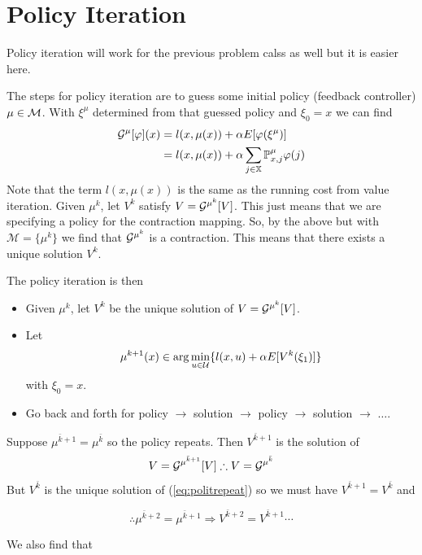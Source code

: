 \section{Policy Iteration}
Policy iteration will work for the previous problem calss as well but it is easier here.

The steps for policy iteration are to guess some initial policy (feedback controller) $\mu\in\mathcal{M}$.
With $\xi^\mu$ determined from that guessed policy and $\xi_0=x$ we can find
\begin{align*}
\mathcal{G}^\mu[\varphi](x) &= l(x,\mu(x))+\alpha E[\varphi(\xi^\mu)] \\
&= l(x,\mu(x)) + \alpha\sum_{j\in\mathbb{X}}\mathbb{P}_{x,j}^\mu\varphi(j)
\end{align*}
Note that the term $l(x,\mu(x))$ is the same as the running cost from value iteration.
Given $\mu^k$, let $V^k$ satisfy $V=\mathcal{G}^{\mu^k}[V]$.
This just means that we are specifying a policy for the contraction mapping.
So, by the above but with $\mathcal{M}=\{\mu^k\}$ we find that $\mathcal{G}^{\mu^k}$ is a contraction.
This means that there exists a unique solution $V^k$.

The policy iteration is then
\begin{itemize}
\item Given $\mu^k$, let $V^k$ be the unique solution of $V=\mathcal{G}^{\mu^k}[V]$.
\item Let
\begin{align}
\label{eq:mukplus1}
\mu^{k+1}(x)\in\arg\min_{u\in\mathcal{U}}\{l(x,u)+\alpha E[V^k(\xi_1)]\}
\end{align}
with $\xi_0=x$.
\item Go back and forth for policy $\to$ solution $\to$ policy $\to$ solution $\to$ $\ldots$.
\end{itemize}

Suppose $\mu^{\bar{k}+1}=\mu^{\bar{k}}$ so the policy repeats.
Then $V^{\bar{k}+1}$ is the solution of
\begin{align}
\label{eq:politrepeat}
V=\mathcal{G}^{\mu^{\bar{k}+1}}[V] \therefore V=\mathcal{G}^{\mu^{\bar{k}}}
\end{align}
But $V^{\bar{k}}$ is the unique solution of (\ref{eq:politrepeat}) so we must have $V^{\bar{k}+1}=V^{\bar{k}}$ and

\begin{equation*}
\therefore \mu^{\bar{k}+2}=\mu^{\bar{k}+1} \Rightarrow V^{\bar{k}+2}=V^{\bar{k}+1} \cdots
\end{equation*}

We also find that

